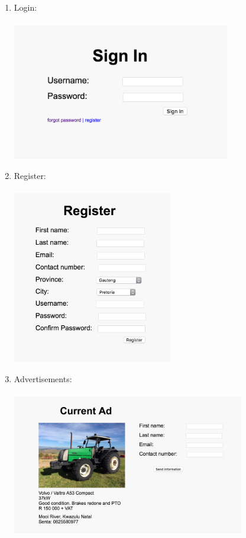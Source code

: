 \documentclass[11pt]{article}
\begin{document}
\begin{enumerate}
		\item Login: \\ \\
			\includegraphics[width=0.75\textwidth]{../Images/Pages/Login} \newpage
		\item Register: \\ \\
			\includegraphics[width=0.55\textwidth]{../Images/Pages/Register}
		\item Advertisements: \\ \\
			\includegraphics[width=0.8\textwidth]{../Images/Pages/ViewAds} \newpage

\end{enumerate}
\end{document}
